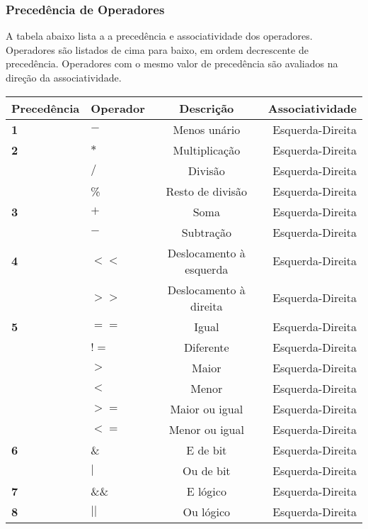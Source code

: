 \documentclass[a4paper,10pt]{article}
\begin{document}
    \subsubsection{Preced\^encia de Operadores}
    A tabela abaixo lista a a preced\^encia e associatividade dos operadores. Operadores s\~ao listados de cima para baixo, em ordem decrescente de preced\^encia. Operadores com o mesmo valor de preced\^encia
    s\~ao avaliados na dire\c{c}\~ao da associatividade.
    \begin{center}
    \begin{tabular}{| l | l | c | r |}
      \hline
	    {\bf Preced\^encia} & {\bf Operador} & {\bf Descri\c{c}\~ao} & {\bf Associatividade} \\
	    \hline
	    {\bf 1} & $-$ & Menos un\'ario & Esquerda-Direita \\
	    \hline
	    {\bf 2} & $*$ & Multiplica\c{c}\~ao & Esquerda-Direita \\
		    & $/$ & Divis\~ao & Esquerda-Direita \\
		    & \% & Resto de divis\~ao & Esquerda-Direita \\
	    \hline
	    {\bf 3} & $+$ & Soma & Esquerda-Direita \\
		    & $-$ & Subtra\c{c}\~ao & Esquerda-Direita \\
	    \hline
	    {\bf 4} & $<<$ & Deslocamento \`a esquerda & Esquerda-Direita \\
		    & $>>$ & Deslocamento \`a direita & Esquerda-Direita \\
	    \hline
	    {\bf 5} & $==$ & Igual & Esquerda-Direita \\
		    & $!=$ & Diferente & Esquerda-Direita \\
		    & $>$ & Maior & Esquerda-Direita \\
		    & $<$ & Menor & Esquerda-Direita \\
		    & $>=$ & Maior ou igual & Esquerda-Direita \\
		    & $<=$ & Menor ou igual & Esquerda-Direita \\
	    \hline
	    {\bf 6} & \& & E de bit & Esquerda-Direita \\
		    & $|$ & Ou de bit & Esquerda-Direita \\
	    \hline
	    {\bf 7} & \&\& & E l\'ogico & Esquerda-Direita \\
	    \hline
	    {\bf 8} & $||$ & Ou l\'ogico & Esquerda-Direita \\    
      \hline
    \end{tabular}
    \end{center}
  
\end{document}
